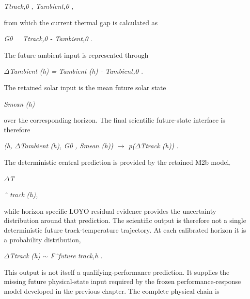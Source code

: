\begin{center}\textit{Ttrack,0 ,        Tambient,0 ,}\end{center}

from which the current thermal gap is calculated as

\begin{center}\textit{G0 = Ttrack,0 - Tambient,0 .}\end{center}

The future ambient input is represented through

\begin{center}\textit{\ensuremath{\Delta}Tambient (h) = Tambient (h) - Tambient,0 .}\end{center}

The retained solar input is the mean future solar state

\begin{center}\textit{Smean (h)}\end{center}

over the corresponding horizon. The final scientific future-state interface is therefore

\begin{center}\textit{(h, \ensuremath{\Delta}Tambient (h), G0 , Smean (h)) \ensuremath{\rightarrow} p(\ensuremath{\Delta}Ttrack (h)) .}\end{center}

The deterministic central prediction is provided by the retained M2b model,

\begin{center}\textit{\ensuremath{\Delta}T}\end{center}

\begin{center}\textit{ˆ track (h),}\end{center}

while horizon-specific LOYO residual evidence provides the uncertainty distribution around that prediction. The scientific output is therefore not a single deterministic future track-temperature trajectory. At each calibrated horizon it is a probability distribution,

\begin{center}\textit{\ensuremath{\Delta}Ttrack (h) \ensuremath{\sim} Fˆfuture track,h .}\end{center}

This output is not itself a qualifying-performance prediction. It supplies the missing future physical-state input required by the frozen performance-response model developed in the previous chapter. The complete physical chain is

